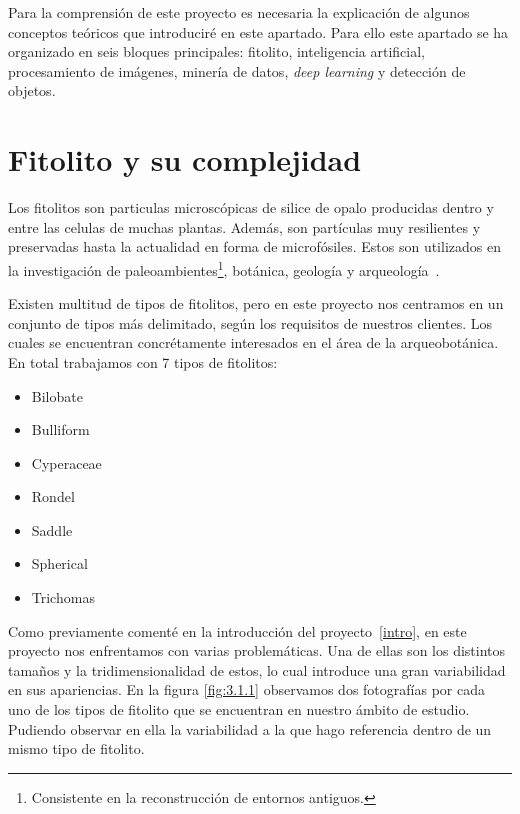 

Para la comprensión de este proyecto es necesaria la explicación de algunos conceptos teóricos que introduciré en este apartado. Para ello este apartado se ha organizado en seis bloques principales: fitolito, inteligencia artificial, procesamiento de imágenes, minería de datos, \textit{deep learning} y detección de objetos.

\section{Fitolito y su complejidad}

Los fitolitos son particulas microscópicas de silice de opalo producidas dentro y entre las celulas de muchas plantas. Además, son partículas muy resilientes y preservadas hasta la actualidad en forma de microfósiles. Estos son utilizados en la investigación de paleoambientes\footnote{Consistente en la reconstrucción de entornos antiguos.}, botánica, geología y arqueología~\cite{phytolith}.

Existen multitud de tipos de fitolitos, pero en este proyecto nos centramos en un conjunto de tipos más delimitado, según los requisitos de nuestros clientes. Los cuales se encuentran concrétamente interesados en el área de la arqueobotánica. En total trabajamos con 7 tipos de fitolitos:

\begin{itemize}
	\item Bilobate
	\item Bulliform
	\item Cyperaceae
	\item Rondel
	\item Saddle
	\item Spherical
	\item Trichomas
\end{itemize}

Como previamente comenté en la introducción del proyecto~\ref{intro}, en este proyecto nos enfrentamos con varias problemáticas. Una de ellas son los distintos tamaños y la tridimensionalidad de estos, lo cual introduce una gran variabilidad en sus apariencias. En la figura \ref{fig:3.1.1} observamos dos fotografías por cada uno de los tipos de fitolito que se encuentran en nuestro ámbito de estudio. Pudiendo observar en ella la variabilidad a la que hago referencia dentro de un mismo tipo de fitolito.

